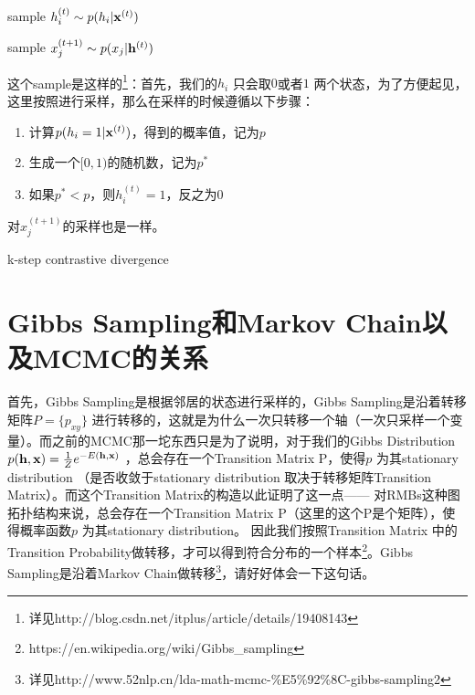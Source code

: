 \documentclass[11pt,fleqn, UTF8]{ctexbook} %
\begin{document}
sample  $h_i^{(t)} \sim   p(h_i|\bold{x}^{(t)})$

sample $x_j^{(t+1)} \sim p(x_j|\bold{h}^{(t)})$


这个sample是这样的\footnote{详见http://blog.csdn.net/itplus/article/details/19408143}：首先，我们的$h_i$ 只会取$0$或者$1$ 两个状态，为了方便起见，这里按照进行采样，那么在采样的时候遵循以下步骤：
\begin{enumerate}
  \item 计算$p(h_i = 1|\bold{x}^{(t)})$，得到的概率值，记为$p$
  \item 生成一个$[0,1)$的随机数，记为$p^*$
  \item 如果$p^* < p$，则$h_i^{(t)}=1$，反之为$0$
\end{enumerate}

对$x_j^{(t+1)}$的采样也是一样。

\begin{algorithm}[H]
 \caption{k-step contrastive divergence}
\end{algorithm}
\section{Gibbs Sampling和Markov Chain以及MCMC的关系}
首先，Gibbs Sampling是根据邻居的状态进行采样的，Gibbs Sampling是沿着转移矩阵$P=\{p_{xy}\}$ 进行转移的，这就是为什么一次只转移一个轴（一次只采样一个变量）。而之前的MCMC那一坨东西只是为了说明，对于我们的Gibbs Distribution $p(\bold{h},\bold{x})=\frac{1}{Z}e^{-E(\bold{h},\bold{x})}$ ，总会存在一个Transition Matrix P，使得$p$ 为其stationary distribution （是否收敛于stationary distribution 取决于转移矩阵Transition Matrix）。而这个Transition Matrix的构造以此证明了这一点—— 对RMBs这种图拓扑结构来说，总会存在一个Transition Matrix P（这里的这个P是个矩阵），使得概率函数$p$ 为其stationary distribution。 因此我们按照Transition Matrix 中的Transition Probability做转移，才可以得到符合分布的一个样本\footnote{https://en.wikipedia.org/wiki/Gibbs\_sampling}。Gibbs Sampling是沿着Markov Chain做转移\footnote{详见http://www.52nlp.cn/lda-math-mcmc-\%E5\%92\%8C-gibbs-sampling2}，请好好体会一下这句话。
\end{document}

